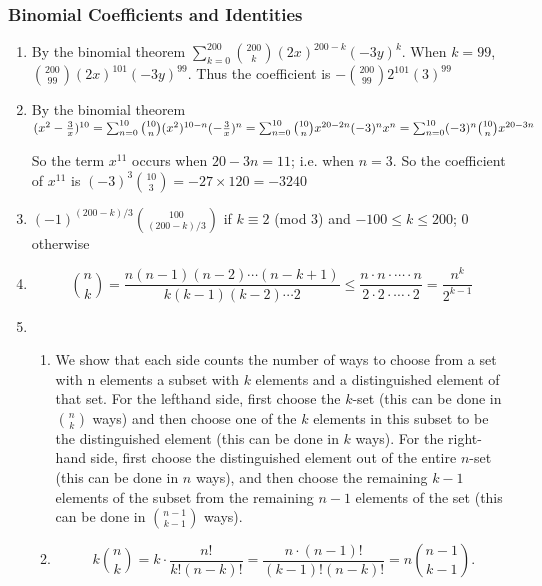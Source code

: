 \documentclass{../../cls/sig-alternate-05-2015}
\begin{document}
\subsubsection{Binomial Coefficients and Identities}
\begin{enumerate}
    \item By the binomial theorem $\sum_{k=0}^{200}\binom{200}{k}(2x)^{200-k}(-3y)^k$. When $k=99$, $\binom{200}{99}(2x)^{101}(-3y)^{99}$. Thus the coefficient is $-\binom{200}{99}2^{101}(3)^{99}$
    
    \item By the binomial theorem     $(x^2-\frac{3}{x})^{10}\\=\sum_{n=0}^{10}\binom{10}{n}(x^2)^{10-n}(-\frac{3}{x})^n
    \\=\sum_{n=0}^{10}\binom{10}{n}x^{20-2n}(-3)^nx^n=\sum_{n=0}^{10}(-3)^n\binom{10}{n} x^{20-3n}$
    
    So the term $x^{11}$ occurs when $20-3n=11$; i.e. when $n=3$. So the coefficient of $x^{11}$ is $(-3)^3\binom{10}{3}=-27\times 120 = -3240$
    
    \item $(-1)^{(200-k)/3} \binom{100}
    {(200-k)/3}$ if $k \equiv 2$ (mod $3$) and $-100 \leq
    k \leq 200$; $0$ otherwise
    
    \item \begin{equation}
    \binom{n}{k} = \frac{n(n - 1)(n - 2) \cdots (n - k + 1)}{k(k - 1)(k - 2) \cdots 2} \le \frac{n \cdot n \cdot \cdots \cdot n}{2 \cdot 2 \cdot \cdots \cdot 2} = \frac{n^k}{2^{k - 1}}
    \end{equation}
    
    \item \begin{enumerate}
        \item We show that each side counts the number of ways
        to choose from a set with n elements a subset with $k$ elements
        and a distinguished element of that set. For the lefthand
        side, first choose the $k$-set (this can be done in $\binom{n}{k}$ ways)
        and then choose one of the $k$ elements in this subset to be
        the distinguished element (this can be done in $k$ ways). For
        the right-hand side, first choose the distinguished element out
        of the entire $n$-set (this can be done in $n$ ways), and then
        choose the remaining $k - 1$ elements of the subset from the
        remaining $n - 1$ elements of the set (this can be done in $\binom{n - 1}{k - 1}$ ways).
        \item \begin{equation}
            k \binom{n}{k} = k \cdot \frac{n!}{k!(n - k)!} = \frac{n \cdot (n - 1)!}{(k - 1)!(n - k)!} = n \binom{n - 1}{k - 1}.
        \end{equation}
    \end{enumerate}
    
\end{enumerate}
\end{document}
